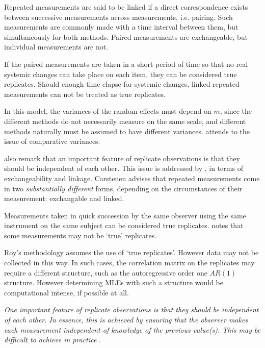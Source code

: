 \documentclass[12pt, a4paper]{report}
\theoremstyle{plain}
\theoremstyle{definition}
\theoremstyle{remark}
\begin{document}
	Repeated measurements are said to be linked if a direct correspondence exists between successive measurements across measurements, i.e. pairing. Such measurements are commonly made with a time interval between them, but simultaneously for both methods. Paired measurements are exchangeable, but individual measurements are not.
	
	If the paired measurements are taken in a short period of time so that no real systemic changes can take place on each item, they can be considered true replicates. Should enough time elapse for systemic changes, linked repeated measurements can not be treated as true replicates.
	
	
	
	
	In this model, the variances of the random effects must depend on
	$m$, since the different methods do not necessarily measure on the 	same scale, and different methods naturally must be assumed to have different variances. \citet{BXC2004} attends to the issue of comparative variances.
	

	\citet{BA99} also remark that an important feature of replicate observations is that they should be independent
	of each other. This issue is addressed by \citet{BXC2010}, in terms of exchangeability and linkage. Carstenen advises that repeated measurements come in two \emph{substantially different} forms, depending on the circumstances of their measurement: exchangable and linked.
	

	Measurements taken in quick succession by the same observer using the same instrument on the same subject can be considered true replicates. \citet{ARoy2009} notes that some measurements may not be `true' replicates.
	
	Roy's methodology assumes the use of `true replicates'. However data may not be collected in this way. In such cases, the correlation matrix on the replicates may require a different structure, such as the autoregressive order one $AR(1)$ structure. However determining MLEs with such a structure would be computational intense, if possible at all.
	
	\emph{
		One important feature of replicate observations is that they should be independent
		of each other. In essence, this is achieved by ensuring that the observer makes each
		measurement independent of knowledge of the previous value(s). This may be difficult
		to achieve in practice} \citep{BA99}.
	
\end{document}
